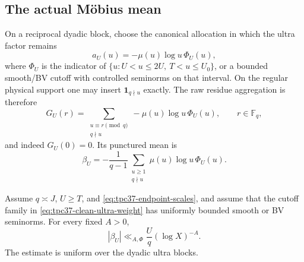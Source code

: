 \subsection{The actual M\"obius mean}

On a reciprocal dyadic block, choose the canonical allocation in which
the ultra factor remains
\begin{equation}
 a_U(u)=-\mu(u)\log u\,\Phi_U(u),
 \label{eq:tpc37-clean-ultra-weight}
\end{equation}
where \(\Phi_U\) is the indicator of
\(\{u:U<u\le2U,\ T<u\le U_0\}\), or a bounded smooth/BV cutoff with
controlled seminorms on that interval.  On the regular physical support one may
insert \(\mathbf 1_{q\nmid u}\) exactly.  The raw residue aggregation is
therefore
\begin{equation}
 G_U(r)=
 \sum_{\substack{u\equiv r\pmod q\\q\nmid u}}
 -\mu(u)\log u\,\Phi_U(u),
 \qquad r\in\mathbb F_q,
 \label{eq:tpc37-regular-ultra-periodization}
\end{equation}
and indeed \(G_U(0)=0\).  Its punctured mean is
\begin{equation}
 \beta_U
 =-\frac1{q-1}
 \sum_{\substack{u\ge1\\q\nmid u}}
 \mu(u)\log u\,\Phi_U(u).
 \label{eq:tpc37-physical-beta}
\end{equation}

\begin{proposition}
\label{prop:tpc37-beta-bound}
Assume \(q\asymp J\), \(U\ge T\), and
\eqref{eq:tpc37-endpoint-scales}, and assume that the cutoff family in
\eqref{eq:tpc37-clean-ultra-weight} has uniformly bounded smooth or BV
seminorms.  For every fixed \(A>0\),
\begin{equation}
 \boxed{
 |\beta_U|
 \ll_{A,\Phi}\frac Uq(\log X)^{-A}.}
 \label{eq:tpc37-beta-bound}
\end{equation}
The estimate is uniform over the dyadic ultra blocks.
\end{proposition}

